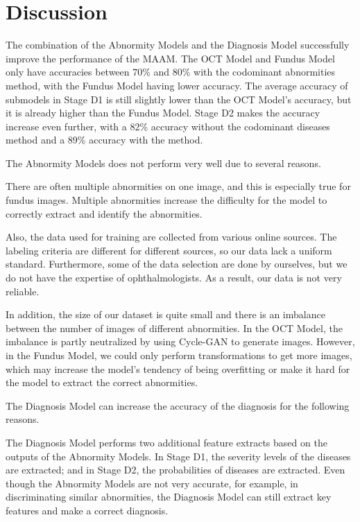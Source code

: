 \documentclass{article}
\begin{document}
	\section{Discussion}
	
	The combination of the Abnormity Models and the Diagnosis Model successfully improve the performance of the MAAM. The OCT Model and Fundus Model only have accuracies between 70\% and 80\% with the codominant abnormities method, with the Fundus Model having lower accuracy. The average accuracy of submodels in Stage D1 is still slightly lower than the OCT Model's accuracy, but it is already higher than the Fundus Model. Stage D2 makes the accuracy increase even further, with a 82\% accuracy without the codominant diseases method and a 89\% accuracy with the method. 
	
	\vspace{0.2cm}
	
	The Abnormity Models does not perform very well due to several reasons. 
	
	There are often multiple abnormities on one image, and this is especially true for fundus images. Multiple abnormities increase the difficulty for the model to correctly extract and identify the abnormities. 
	
	Also, the data used for training are collected from various online sources. The labeling criteria are different for different sources, so our data lack a uniform standard. Furthermore, some of the data selection are done by ourselves, but we do not have the expertise of ophthalmologists. As a result, our data is not very reliable. 
	
	In addition, the size of our dataset is quite small and there is an imbalance between the number of images of different abnormities. In the OCT Model, the imbalance is partly neutralized by using Cycle-GAN to generate images. However, in the Fundus Model, we could only perform transformations to get more images, which may increase the model's tendency of being overfitting or make it hard for the model to extract the correct abnormities. 
	
	\vspace{0.2cm}
	
	The Diagnosis Model can increase the accuracy of the diagnosis for the following reasons.
	
	The Diagnosis Model performs two additional feature extracts based on the outputs of the Abnormity Models. In Stage D1, the severity levels of the diseases are extracted; and in Stage D2, the probabilities of diseases are extracted. Even though the Abnormity Models are not very accurate, for example, in discriminating similar abnormities, the Diagnosis Model can still extract key features and make a correct diagnosis. 
	
\end{document}
